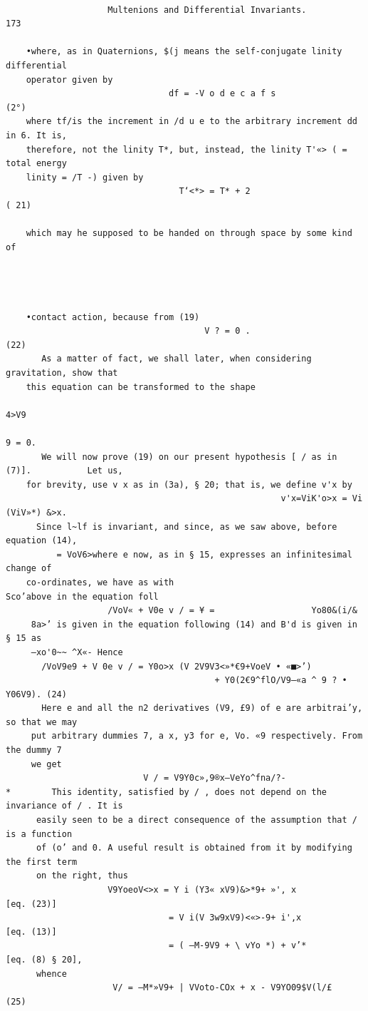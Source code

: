 \documentclass[10pt]{article}
\begin{document}
\clearpage
\begin{verbatim}

                    Multenions and Differential Invariants.                           173

    •where, as in Quaternions, $(j means the self-conjugate linity differential
    operator given by
                                df = -V o d e c a f s                     (2°)
    where tf/is the increment in /d u e to the arbitrary increment dd in 6. It is,
    therefore, not the linity T*, but, instead, the linity T'«> ( = total energy
    linity = /T -) given by
                                  T‘<*> = T* + 2                             ( 21)

    which may he supposed to be handed on through space by some kind of




    •contact action, because from (19)
                                       V ? = 0 .                   (22)
       As a matter of fact, we shall later, when considering gravitation, show that
    this equation can be transformed to the shape
                                                                             4>V9
                                                                               9 = 0.
       We will now prove (19) on our present hypothesis [ / as in (7)].           Let us,
    for brevity, use v x as in (3a), § 20; that is, we define v'x by
                                                      v'x=ViK'o>x = Vi (ViV»*) &>x.
      Since l~lf is invariant, and since, as we saw above, before equation (14),
          = VoV6>where e now, as in § 15, expresses an infinitesimal change of
    co-ordinates, we have as with                              Sco’above in the equation foll
                    /VoV« + V0e v / = ¥ =                   Yo80&(i/&
     8a>’ is given in the equation following (14) and B'd is given in § 15 as
     —xo'0~~ ^X«- Hence
       /VoV9e9 + V 0e v / = Y0o>x (V 2V9V3<»*€9+VoeV • «■>’)
                                         + Y0(2€9^flO/V9—«a ^ 9 ? • Y06V9). (24)
       Here e and all the n2 derivatives (V9, £9) of e are arbitrai’y, so that we may
     put arbitrary dummies 7, a x, y3 for e, Vo. «9 respectively. From the dummy 7
     we get
                           V / = V9Y0c»,9®x—VeYo^fna/?-
*        This identity, satisfied by / , does not depend on the invariance of / . It is
      easily seen to be a direct consequence of the assumption that / is a function
      of (o’ and 0. A useful result is obtained from it by modifying the first term
      on the right, thus
                    V9YoeoV<>x = Y i (Y3« xV9)&>*9+ »', x            [eq. (23)]
                                = V i(V 3w9xV9)<«>-9+ i',x           [eq. (13)]
                                = ( —M-9V9 + \ vYo *) + v’*         [eq. (8) § 20],
      whence
                     V/ = —M*»V9+ | VVoto-COx + x - V9YO09$V(l/£                      (25)


\end{verbatim}
\end{document}
